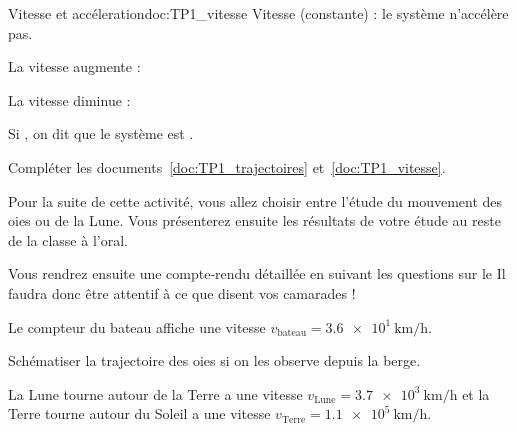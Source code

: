 \begin{doc}{Vitesse et accéleration}{doc:TP1_vitesse}
  Vitesse  (constante) : le système n’accélère pas.
  
  La vitesse augmente : 
  
  La vitesse diminue : 
  
  Si , on dit que le système est .
\end{doc}



\numeroQuestion
Compléter les documents~\ref{doc:TP1_trajectoires} et~\ref{doc:TP1_vitesse}.

\fleche Pour la suite de cette activité, vous allez choisir entre l'étude du mouvement des oies ou de la Lune.
Vous présenterez ensuite les résultats de votre étude au reste de la classe à l'oral.

\fleche Vous rendrez ensuite une compte-rendu détaillée en suivant les questions sur le 
Il faudra donc être attentif à ce que disent vos camarades !


\pasCorrection{\newpage}

Le compteur du bateau affiche une vitesse $v_\text{bateau} = \qty{3,6e1}{\km/\hour}$.



\mesure Schématiser la trajectoire des oies si on les observe depuis la berge.



La Lune tourne autour de la Terre a une vitesse $v_\text{Lune} = \qty{3,7e3}{\km/\hour}$
et la Terre tourne autour du Soleil a une vitesse $v_\text{Terre} = \qty{1,1e5}{\km/\hour}$.

\medskip

